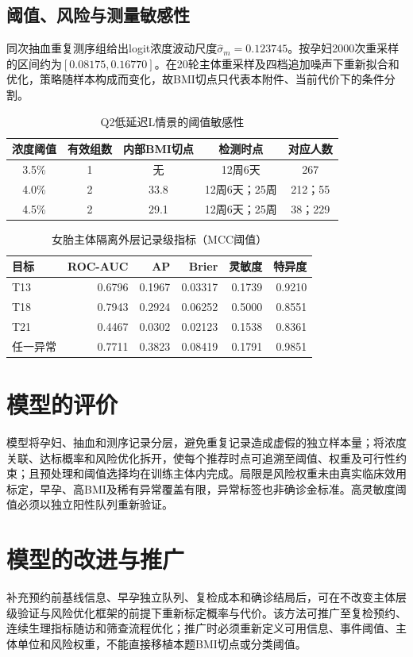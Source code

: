 \documentclass[withoutpreface,bwprint]{format}
\begin{document}
\subsection{阈值、风险与测量敏感性}
同次抽血重复测序组给出logit浓度波动尺度$\hat\sigma_m=0.123745$。按孕妇2000次重采样的区间约为$[0.08175,0.16770]$。在20轮主体重采样及四档追加噪声下重新拟合和优化，策略随样本构成而变化，故BMI切点只代表本附件、当前代价下的条件分割。
\begin{table}[H]\centering\small
\caption{Q2低延迟L情景的阈值敏感性}\label{tab:threshold}
\begin{tabular}{ccccc}\toprule 浓度阈值&有效组数&内部BMI切点&检测时点&对应人数\\\midrule
3.5\%&1&无&12周6天&267\\
4.0\%&2&33.8&12周6天；25周&212；55\\
4.5\%&2&29.1&12周6天；25周&38；229\\
\bottomrule\end{tabular}\end{table}
\begin{table}[H]\centering\small
\caption{女胎主体隔离外层记录级指标（MCC阈值）}\label{tab:q4metrics}
\begin{tabular}{lrrrrr}\toprule 目标&ROC-AUC&AP&Brier&灵敏度&特异度\\\midrule
T13&0.6796&0.1967&0.03317&0.1739&0.9210\\
T18&0.7943&0.2924&0.06252&0.5000&0.8551\\
T21&0.4467&0.0302&0.02123&0.1538&0.8361\\
任一异常&0.7711&0.3823&0.08419&0.1791&0.9851\\
\bottomrule\end{tabular}\end{table}

\section{模型的评价}
模型将孕妇、抽血和测序记录分层，避免重复记录造成虚假的独立样本量；将浓度关联、达标概率和风险优化拆开，使每个推荐时点可追溯至阈值、权重及可行性约束；且预处理和阈值选择均在训练主体内完成。局限是风险权重未由真实临床效用标定，早孕、高BMI及稀有异常覆盖有限，异常标签也非确诊金标准。高灵敏度阈值必须以独立阳性队列重新验证。

\section{模型的改进与推广}
补充预约前基线信息、早孕独立队列、复检成本和确诊结局后，可在不改变主体层级验证与风险优化框架的前提下重新标定概率与代价。该方法可推广至复检预约、连续生理指标随访和筛查流程优化；推广时必须重新定义可用信息、事件阈值、主体单位和风险权重，不能直接移植本题BMI切点或分类阈值。
\end{document}
